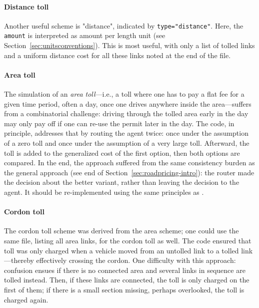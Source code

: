 \paragraph{Distance toll} Another useful scheme is "distance", indicated by \lstinline$type="distance"$. Here, the \lstinline$amount$ is interpreted as amount per length unit (see Section~\ref{sec:unitsconventions}). This is most useful, with only a list of tolled links and a uniform distance cost for all these links noted at the end of the file.

\paragraph{Area toll} The simulation of an \emph{area toll}---i.e., a toll where one has to pay a flat fee for a given time period, often a day, once one drives anywhere inside the area---suffers from a combinatorial challenge: driving through the tolled area early in the day may only pay off if one can re-use the permit later in the day. The code, in principle, addresses that by routing the agent twice: once under the assumption of a zero toll and once under the assumption of a very large toll. Afterward, the toll is added to the generalized cost of the first option, then both options are compared.  
%
In the end, the approach suffered from the same consistency burden as the general approach (see end of Section~\ref{sec:roadpricing-intro}): the router made the decision about the better variant, rather than leaving the decision to the agent. It should be re-implemented using the same principles as \citet{NagelKickhoeferJoubert2014HeterogeneousVoTsPROCEDIA}.

\paragraph{Cordon toll} The cordon toll scheme was derived from the area scheme; one could use the same file, listing all area links, for the cordon toll as well. The code ensured that toll was only charged when a vehicle moved from an untolled link to a tolled link---thereby effectively crossing the cordon. One difficulty with this approach: confusion ensues if there is no connected area and several links in sequence are tolled instead.  Then, if these links are connected, the toll is only charged on the first of them; if there is a small section missing, perhaps overlooked, the toll is charged again. 


